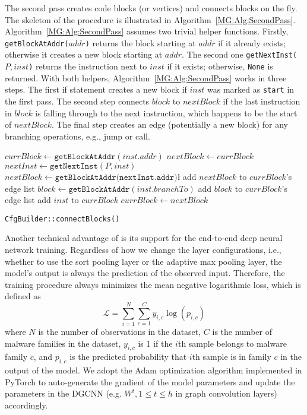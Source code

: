 The second pass creates code blocks (or vertices) and connects blocks on the fly.
The skeleton of the procedure is illustrated in Algorithm~\ref{MG:Alg:SecondPass}.
Algorithm~\ref{MG:Alg:SecondPass} assumes two trivial helper functions.
Firstly, \texttt{getBlockAtAddr($addr$)} returns the block starting at $addr$
if it already exists; otherwise it creates a new block starting at $addr$.
The second one \texttt{getNextInst($P, inst$)} returns the instruction next to $inst$ if it exists; otherwise, \texttt{None} is returned.
With both helpers, Algorithm~\ref{MG:Alg:SecondPass} works in three steps.
The first if statement creates a new block if $inst$ was marked as \texttt{start} in the first pass.
The second step connects $block$ to $nextBlock$ if the last instruction in $block$ is falling through to the next instruction, which happens to be the start of $nextBlock$.
The final step creates an edge (potentially a new block) for any branching operations, e.g., jump or call.

\begin{algorithm}[t]
    \DontPrintSemicolon
     {
         {
            $currBlock \gets \texttt{getBlockAtAddr}(inst.addr)$\;
        }
        $nextBlock \gets currBlock$\;
        $nextInst \gets \texttt{getNextInst}(P, inst)$\;
         {
             {
                $nextBlock \gets \texttt{getBlockAtAddr(nextInst.addr)}$\l\;
                add $nextBlock$ to $currBlock$'s edge list\;
            }
        }
         {
            $block \gets \texttt{getBlockAtAddr}(inst.branchTo)$\;
            add $block$ to $currBlock$'s edge list\;
        }
        add $inst$ to $currBlock$\;
        $currBlock \gets nextBlock$\;
    }
    \caption{\texttt{CfgBuilder::connectBlocks()}}
    \label{MG:Alg:SecondPass}
\end{algorithm}

Another technical advantage of \sysname is its support for the end-to-end deep neural network training.
Regardless of how we change the layer configurations, i.e., whether to use the sort pooling layer or the adaptive max pooling layer, the model's output is always the prediction of the observed input.
Therefore, the training procedure always minimizes the mean negative logarithmic loss, which is defined as
\begin{equation}
    \mathcal{L} = \sum_{i=1}^{N} \sum_{c=1}^{C} y_{i, c} \log(p_{i, c})
\end{equation}
where $N$ is the number of observations in the dataset, $C$ is the number of malware families in the dataset, 
$y_{i, c}$ is 1 if the $i$th sample belongs to malware family $c$,
and $p_{i, c}$ is the predicted probability that $i$th sample is in family $c$ in the output of the model.
We adopt the Adam optimization algorithm \cite{Adam} implemented in PyTorch \cite{PyTorch} to auto-generate the gradient of the model parameters and update the parameters in the DGCNN (e.g. $W^t, 1 \leq t \leq h$ in graph convolution layers) accordingly.

